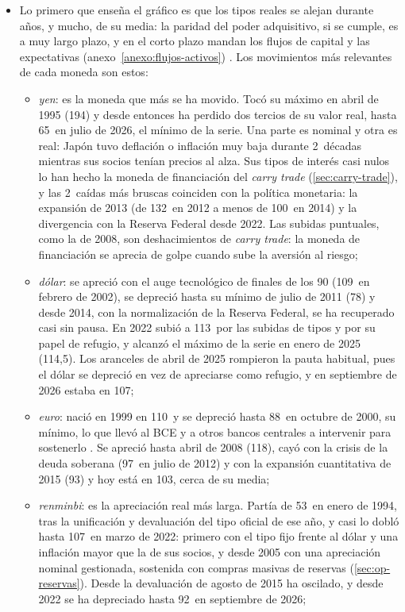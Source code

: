 \documentclass[11pt]{article}
\begin{document}
\begin{itemize}
\item Lo primero que enseña el gráfico es que los tipos reales se alejan durante años, y mucho, de su media: la paridad del poder adquisitivo, si se cumple, es a muy largo plazo, y en el corto plazo mandan los flujos de capital y las expectativas (anexo~\ref{anexo:flujos-activos}) . Los movimientos más relevantes de cada moneda son estos:
  \begin{itemize}
  \item \emph{yen}: es la moneda que más se ha movido. Tocó su máximo en abril de 1995 (194)\nocite{BIS2026EER} y desde entonces ha perdido dos tercios de su valor real, hasta 65~en julio de 2026, el mínimo de la serie. Una parte es nominal y otra es real: Japón tuvo deflación o inflación muy baja durante 2~décadas mientras sus socios tenían precios al alza. Sus tipos de interés casi nulos lo han hecho la moneda de financiación del \emph{carry trade} (\ref{sec:carry-trade}), y las 2~caídas más bruscas coinciden con la política monetaria: la expansión de 2013 (de 132~en 2012 a menos de 100~en 2014) y la divergencia con la Reserva Federal desde 2022. Las subidas puntuales, como la de 2008, son deshacimientos de \emph{carry trade}: la moneda de financiación se aprecia de golpe cuando sube la aversión al riesgo;
  \item \emph{dólar}: se apreció con el auge tecnológico de finales de los 90 (109~en febrero de 2002)\nocite{BIS2026EER}, se depreció hasta su mínimo de julio de 2011 (78) y desde 2014, con la normalización de la Reserva Federal, se ha recuperado casi sin pausa. En 2022 subió a 113~por las subidas de tipos y por su papel de refugio, y alcanzó el máximo de la serie en enero de 2025 (114,5). Los aranceles de abril de 2025 rompieron la pauta habitual, pues el dólar se depreció en vez de apreciarse como refugio, y en septiembre de 2026 estaba en 107;
  \item \emph{euro}: nació en 1999 en 110~y se depreció hasta 88~en octubre de 2000, su mínimo, lo que llevó al BCE y a otros bancos centrales a intervenir para sostenerlo . Se apreció hasta abril de 2008 (118), cayó con la crisis de la deuda soberana (97~en julio de 2012) y con la expansión cuantitativa de 2015 (93) y hoy está en 103, cerca de su media;
  \item \emph{renminbi}: es la apreciación real más larga. Partía de 53~en enero de 1994, tras la unificación y devaluación del tipo oficial de ese año, y casi lo dobló hasta 107~en marzo de 2022: primero con el tipo fijo frente al dólar y una inflación mayor que la de sus socios, y desde 2005 con una apreciación nominal gestionada, sostenida con compras masivas de reservas (\ref{sec:op-reservas}). Desde la devaluación de agosto de 2015 ha oscilado, y desde 2022 se ha depreciado hasta 92~en septiembre de 2026;

\end{itemize}
\end{itemize}
\end{document}
